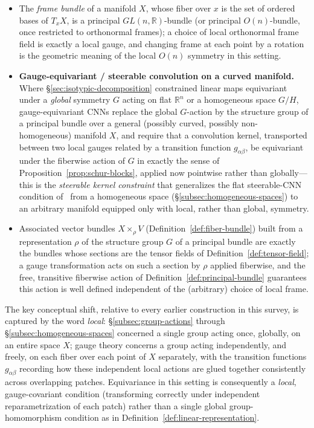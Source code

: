 \documentclass[mathematics,review,submit,moreauthors]{Definitions/mdpi}
\begin{document}
\begin{Example}
\label{ex:principal-bundles-learning}
\begin{itemize}
    \item The \emph{frame bundle} of a manifold $X$, whose fiber over $x$ is
    the set of ordered bases of $T_xX$, is a principal $GL(n,\mathbb{R})$-bundle
    (or principal $O(n)$-bundle, once restricted to orthonormal frames); a
    choice of local orthonormal frame field is exactly a local gauge, and
    changing frame at each point by a rotation is the geometric meaning of
    the local $O(n)$ symmetry in this setting.
    \item \textbf{Gauge-equivariant / steerable convolution on a curved
    manifold.} Where \S\ref{sec:isotypic-decomposition} constrained
    linear maps equivariant under a \emph{global} symmetry $G$ acting on
    flat $\mathbb{R}^n$ or a homogeneous space $G/H$, gauge-equivariant CNNs
    replace the global $G$-action by the structure group of a principal
    bundle over a general (possibly curved, possibly non-homogeneous)
    manifold $X$, and require that a convolution kernel, transported between
    two local gauges related by a transition function $g_{\alpha\beta}$, be
    equivariant under the fiberwise action of $G$ in exactly the sense of
    Proposition~\ref{prop:schur-blocks}, applied now pointwise rather than
    globally---this is the \emph{steerable kernel constraint} that
    generalizes the flat steerable-CNN condition of~\cite{weiler2019anips}
    from a homogeneous space (\S\ref{subsec:homogeneous-spaces}) to an
    arbitrary manifold equipped only with local, rather than global,
    symmetry.
    \item Associated vector bundles $X \times_\rho V$
    (Definition~\ref{def:fiber-bundle}) built from a representation $\rho$
    of the structure group $G$ of a principal bundle are exactly the
    bundles whose sections are the tensor fields of
    Definition~\ref{def:tensor-field}; a gauge transformation acts on such a
    section by $\rho$ applied fiberwise, and the free, transitive fiberwise
    action of Definition~\ref{def:principal-bundle} guarantees this action
    is well defined independent of the (arbitrary) choice of local frame.
\end{itemize}
\end{Example}

The key conceptual shift, relative to every earlier construction in this
survey, is captured by the word \emph{local}: \S\ref{subsec:group-actions}
through \S\ref{subsec:homogeneous-spaces} concerned a single group acting
once, globally, on an entire space $X$; gauge theory concerns a group acting
independently, and freely, on each fiber over each point of $X$
separately, with the transition functions $g_{\alpha\beta}$ recording how
these independent local actions are glued together consistently across
overlapping patches. Equivariance in this setting is consequently a
\emph{local}, gauge-covariant condition (transforming correctly under
independent reparametrization of each patch) rather than a single global
group-homomorphism condition as in Definition~\ref{def:linear-representation}.
\end{document}
